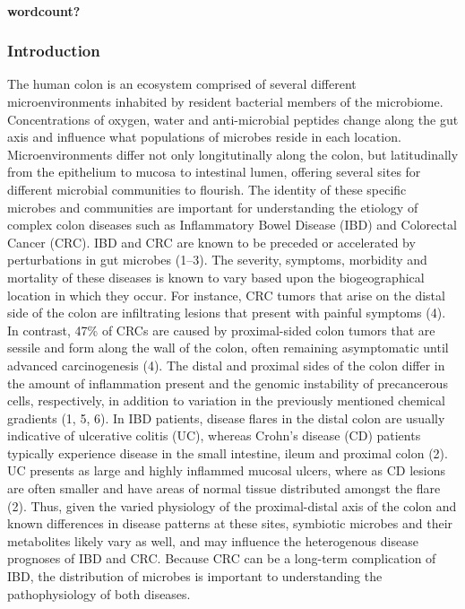 \documentclass[11pt,]{article}
\let\oldparagraph\paragraph
\renewcommand{\paragraph}[1]{\oldparagraph{#1}\mbox{}}
\begin{document}
\paragraph{wordcount?}\label{wordcount}

\subsubsection{Introduction}\label{introduction}

The human colon is an ecosystem comprised of several different
microenvironments inhabited by resident bacterial members of the
microbiome. Concentrations of oxygen, water and anti-microbial peptides
change along the gut axis and influence what populations of microbes
reside in each location. Microenvironments differ not only
longitutinally along the colon, but latitudinally from the epithelium to
mucosa to intestinal lumen, offering several sites for different
microbial communities to flourish. The identity of these specific
microbes and communities are important for understanding the etiology of
complex colon diseases such as Inflammatory Bowel Disease (IBD) and
Colorectal Cancer (CRC). IBD and CRC are known to be preceded or
accelerated by perturbations in gut microbes (1--3). The severity,
symptoms, morbidity and mortality of these diseases is known to vary
based upon the biogeographical location in which they occur. For
instance, CRC tumors that arise on the distal side of the colon are
infiltrating lesions that present with painful symptoms (4). In
contrast, 47\% of CRCs are caused by proximal-sided colon tumors that
are sessile and form along the wall of the colon, often remaining
asymptomatic until advanced carcinogenesis (4). The distal and proximal
sides of the colon differ in the amount of inflammation present and the
genomic instability of precancerous cells, respectively, in addition to
variation in the previously mentioned chemical gradients (1, 5, 6). In
IBD patients, disease flares in the distal colon are usually indicative
of ulcerative colitis (UC), whereas Crohn's disease (CD) patients
typically experience disease in the small intestine, ileum and proximal
colon (2). UC presents as large and highly inflammed mucosal ulcers,
where as CD lesions are often smaller and have areas of normal tissue
distributed amongst the flare (2). Thus, given the varied physiology of
the proximal-distal axis of the colon and known differences in disease
patterns at these sites, symbiotic microbes and their metabolites likely
vary as well, and may influence the heterogenous disease prognoses of
IBD and CRC. Because CRC can be a long-term complication of IBD, the
distribution of microbes is important to understanding the
pathophysiology of both diseases.
\end{document}

